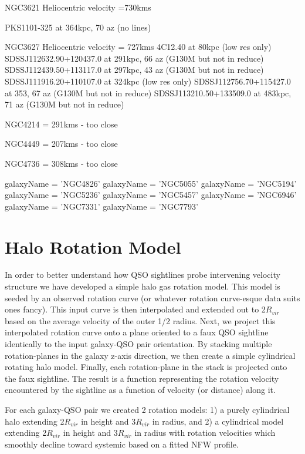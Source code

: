 \documentclass[iop]{emulateapj-rtx4}
\begin{document}
NGC3621
Heliocentric velocity =730kms

PKS1101-325 at 364kpc, 70 az (no lines)

NGC3627
Heliocentric velocity = 727kms
4C12.40 at 80kpc (low res only)
SDSSJ112632.90+120437.0 at 291kpc, 66 az (G130M but not in reduce)
SDSSJ112439.50+113117.0 at 297kpc, 43 az (G130M but not in reduce)
SDSSJ111916.20+110107.0 at 324kpc (low res only)
SDSSJ112756.70+115427.0 at 353, 67 az (G130M but not in reduce)
SDSSJ113210.50+133509.0 at 483kpc, 71 az (G130M but not in reduce)


NGC4214  = 291kms - too close

NGC4449 = 207kms - too close

NGC4736 = 308kms - too close


galaxyName = 'NGC4826'
galaxyName = 'NGC5055'
galaxyName = 'NGC5194'
galaxyName = 'NGC5236'
galaxyName = 'NGC5457'
galaxyName = 'NGC6946'
galaxyName = 'NGC7331'
galaxyName = 'NGC7793'



\section{Halo Rotation Model}
In order to better understand how QSO sightlines probe intervening velocity structure we have developed a simple halo gas rotation model. This model is seeded by an observed rotation curve (or whatever rotation curve-esque data suits ones fancy). This input curve is then interpolated and extended out to 2$R_{vir}$ based on the average velocity of the outer 1/2 radius. Next, we project this interpolated rotation curve onto a plane oriented to a faux QSO sightline identically to the input galaxy-QSO pair orientation. By stacking multiple rotation-planes in the galaxy z-axis direction, we then create a simple cylindrical rotating halo model. Finally, each rotation-plane in the stack is projected onto the faux sightline. The result is a function representing the rotation velocity encountered by the sightline as a function of velocity (or distance) along it.

For each galaxy-QSO pair we created 2 rotation models: 1) a purely cylindrical halo extending 2$R_{vir}$ in height and 3$R_{vir}$ in radius, and 2) a cylindrical model extending 2$R_{vir}$ in height and 3$R_{vir}$ in radius with rotation velocities which smoothly decline toward systemic based on a fitted NFW profile.



\end{document}
